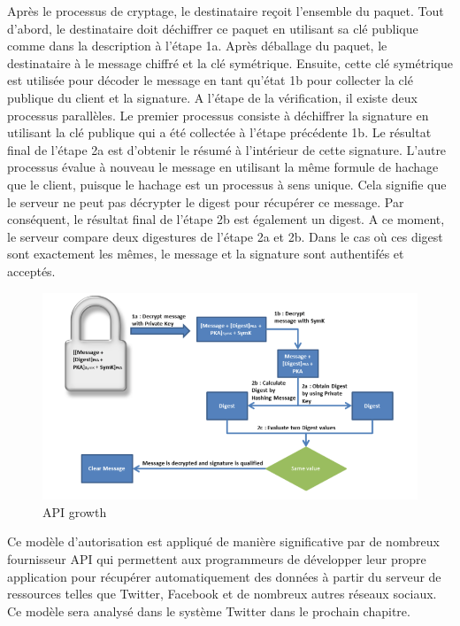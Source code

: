 \begin{itemize}
Après le processus de cryptage, le destinataire reçoit l'ensemble du paquet. Tout d'abord, le destinataire doit déchiffrer ce paquet en utilisant sa clé publique comme dans la description à l'étape 1a. Après déballage du paquet, le destinataire à le message chiffré et la clé symétrique. Ensuite, cette clé symétrique est utilisée pour décoder le message en tant qu'état 1b pour collecter la clé publique du client et la signature.
A l'étape de la vérification, il existe deux processus parallèles. Le premier processus consiste à déchiffrer la signature en utilisant la clé publique qui a été collectée à l'étape précédente 1b. Le résultat final de l'étape 2a est d'obtenir le résumé à l'intérieur de cette signature. L'autre processus évalue à nouveau le message en utilisant la même formule de hachage que le client, puisque le hachage est un processus à sens unique. Cela signifie que le serveur ne peut pas décrypter le digest pour récupérer ce message. Par conséquent, le résultat final de l'étape 2b est également un digest. A ce moment, le serveur compare deux digestures de l'étape 2a et 2b. Dans le cas où ces digest sont exactement les mêmes, le message et la signature sont authentifés et acceptés.
\begin{figure}[! ht ]
			\centering
			\includegraphics[scale=.4]{./images/api_decryption_detail.png}
			\caption {API growth}
		\end{figure}
Ce modèle d'autorisation est appliqué de manière significative par de nombreux fournisseur API qui permettent aux programmeurs de développer leur propre application pour récupérer automatiquement des données à partir du serveur de ressources telles que Twitter, Facebook et de nombreux autres réseaux sociaux. Ce modèle sera analysé dans le système Twitter dans le prochain chapitre.
\end{itemize}




